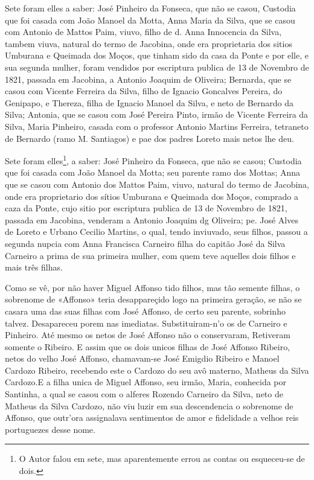 Sete foram elles a saber: José Pinheiro da Fonseca, que não se casou, Custodia que foi casada com João Manoel da Motta, Anna Maria da Silva, que se casou com Antonio de Mattos Paim, viuvo, filho de d. Anna Innocencia da Silva, tambem viuva, natural do termo de Jacobina, onde era proprietaria dos sitios Umburana e Queimada dos Moços, que tinham sido da casa da Ponte e por elle, e sua segunda mulher, foram vendidos por escriptura publica de 13 de Novembro de 1821, passada em Jacobina, a Antonio Joaquim de Oliveira; Bernarda, que se casou com Vicente Ferreira da Silva, filho de Ignacio Goncalves Pereira, do Genipapo, e Thereza, filha de Ignacio Manoel da Silva, e neto de Bernardo da Silva; Antonia, que se casou com José Pereira Pinto, irmão de Vicente Ferreira da Silva, Maria Pinheiro, casada com o professor Antonio Martins Ferreira, tetraneto de Bernardo (ramo M. Santiagos) e pae dos padres Loreto mais netos lhe deu. 

Sete foram elles\footnote{O Autor falou em sete, mas aparentemente errou as contas ou esqueceu-se de dois.}, a saber: José Pinheiro da Fonseca, que não se casou; Custodia que foi casada com João Manoel da Motta; seu parente ramo dos Mottas; Anna que se casou com Antonio dos Mattos Paim, viuvo, natural do termo de Jacobina, onde era proprietario dos sítios Umburana e Queimada dos Moços, comprado a caza da Ponte, cujo sitio por escriptura publica de 13 de Novembro de 1821, passada em Jacobina, venderam a Antonio Joaquim dg Oliveira; pe. José Alves de Loreto e Urbano Cecilio Martins, o qual, tendo inviuvado, seus filhos, passou a segunda nupcia com Anna Francisca Carneiro filha do capitão José da Silva Carneiro a prima de sua primeira mulher, com quem teve aquelles dois filhos e mais três filhas.

Como se vê, por não haver Miguel Affonso tido filhos, mas tão semente filhas, o sobrenome de «Affonso» teria desappareçido logo na primeira geração, se não se casara uma das suas filhas com José Affonso, de certo seu parente, sobrinho talvez. Desapareceu porem nas imediatas. Substituiram-n'o os de Carneiro e Pinheiro. Até mesmo os netos de José Affonso não o conservaram, Retiveram somente o Ribeiro. E assim que os dois unicos filhas de José Affonso Ribeiro, netos do velho José Affonso, chamavam-se José Emigdio Ribeiro e Manoel Cardozo Ribeiro, recebendo este o Cardozo do seu avô materno, Matheus da Silva Cardozo.E a filha unica de Miguel Affonso, seu irmão, Maria, conhecida por Santinha, a qual se casou com o alferes Rozendo Carneiro da Silva, neto de Matheus da Silva Cardozo, não viu luzir em sua descendencia o sobrenome de Affonso, que outr'ora assignalava sentimentos de amor e fidelidade a velhos reis portuguezes desse nome.

